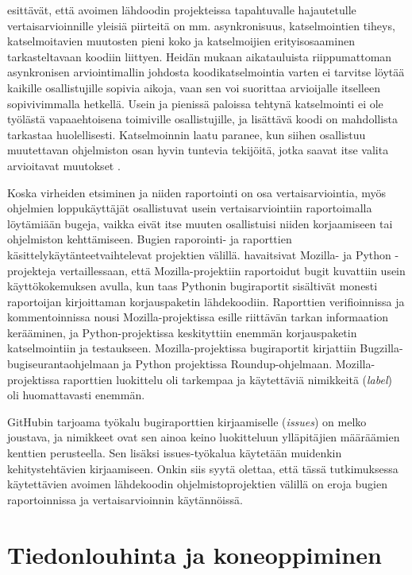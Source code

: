 \documentclass[utf8]{gradu3}
\begin{document}
\textcite{Rigby-2012} esittävät, että avoimen lähdoodin projekteissa
tapahtuvalle hajautetulle vertaisarvioinnille yleisiä piirteitä on mm.
asynkronisuus, katselmointien tiheys, katselmoitavien muutosten pieni koko ja
katselmoijien erityisosaaminen tarkasteltavaan koodiin liittyen. Heidän
mukaan aikatauluista riippumattoman asynkronisen arviointimallin johdosta
koodikatselmointia varten ei tarvitse löytää kaikille osallistujille sopivia
aikoja, vaan sen voi suorittaa arvioijalle itselleen sopivivimmalla hetkellä.
Usein ja pienissä paloissa tehtynä katselmointi ei ole työlästä vapaaehtoisena
toimiville osallistujille, ja lisättävä koodi on mahdollista tarkastaa
huolellisesti. Katselmoinnin laatu paranee, kun siihen osallistuu muutettavan
ohjelmiston osan hyvin tuntevia tekijöitä, jotka saavat itse valita arvioitavat
muutokset \parencite{Rigby-2012, Rigby-2014}.

Koska virheiden etsiminen ja niiden
raportointi on osa vertaisarviointia, myös ohjelmien loppukäyttäjät
osallistuvat usein vertaisarviointiin raportoimalla löytämiään bugeja, vaikka
eivät itse muuten osallistuisi niiden korjaamiseen tai ohjelmiston kehttämiseen.
Bugien raporointi- ja raporttien käsittelykäytänteetvaihtelevat projektien välillä.
\textcite{Wang-2015} havaitsivat Mozilla- ja
Python -projekteja vertaillessaan, että Mozilla-projektiin raportoidut bugit
kuvattiin usein käyttökokemuksen avulla, kun taas Pythonin bugiraportit
sisältivät monesti raportoijan kirjoittaman korjauspaketin lähdekoodiin.
Raporttien verifioinnissa ja kommentoinnissa nousi Mozilla-projektissa esille
riittävän tarkan informaation kerääminen, ja Python-projektissa keskityttiin
enemmän korjauspaketin katselmointiin ja testaukseen. Mozilla-projektissa
bugiraportit kirjattiin Bugzilla-bugiseurantaohjelmaan ja Python projektissa
Roundup-ohjelmaan. Mozilla-projektissa raporttien luokittelu oli tarkempaa ja
käytettäviä nimikkeitä (\textit{label}) oli huomattavasti enemmän.
\parencite{Wang-2015}

GitHubin tarjoama työkalu bugiraporttien kirjaamiselle (\textit{issues}) on
melko joustava, ja nimikkeet ovat sen ainoa keino luokitteluun ylläpitäjien
määräämien kenttien perusteella. Sen lisäksi issues-työkalua käytetään muidenkin
kehitystehtävien kirjaamiseen.  Onkin siis syytä olettaa, että tässä
tutkimuksessa käytettävien avoimen lähdekoodin ohjelmistoprojektien välillä on
eroja bugien raportoinnissa ja vertaisarvioinnin käytännöissä.

\chapter{Tiedonlouhinta ja koneoppiminen}
\end{document}
